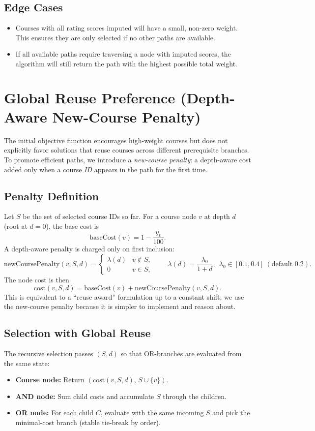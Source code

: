 \documentclass[11pt]{article}
\begin{document}
\subsection{Edge Cases}

\begin{itemize}
    \item Courses with all rating scores imputed will have a small, non-zero weight. This ensures they are only selected if no other paths are available.
    \item If all available paths require traversing a node with imputed scores, the algorithm will still return the path with the highest possible total weight.
\end{itemize}

\section{Global Reuse Preference (Depth-Aware New-Course Penalty)}
\label{sec:reuse-penalty}

The initial objective function encourages high-weight courses but does not explicitly favor solutions that reuse courses across different prerequisite branches. To promote efficient paths, we introduce a \emph{new-course penalty}: a depth-aware cost added only when a course \emph{ID} appears in the path for the first time.

\subsection{Penalty Definition}
Let $S$ be the set of selected course IDs so far. For a course node $v$ at depth $d$ (root at $d=0$), the base cost is
\[
  \text{baseCost}(v) = 1 - \frac{y_v}{100}.
\]
A depth-aware penalty is charged only on first inclusion:
\[
  \text{newCoursePenalty}(v, S, d) =
  \begin{cases}
    \lambda(d) & v \notin S,\\
    0 & v \in S,
  \end{cases}
\qquad \lambda(d) = \dfrac{\lambda_0}{1+d},\ \ \lambda_0\in[0.1,0.4] \ (\text{default }0.2).
\]
The node cost is then
\[
  \text{cost}(v, S, d) = \text{baseCost}(v) + \text{newCoursePenalty}(v, S, d).
\]
This is equivalent to a ``reuse award'' formulation up to a constant shift; we use the new-course penalty because it is simpler to implement and reason about.

\subsection{Selection with Global Reuse}
The recursive selection passes $(S,d)$ so that OR-branches are evaluated from the same state:
\begin{itemize}
  \item \textbf{Course node:} Return $(\text{cost}(v,S,d),\, S\cup\{v\})$.
  \item \textbf{AND node:} Sum child costs and accumulate $S$ through the children.
  \item \textbf{OR node:} For each child $C$, evaluate with the same incoming $S$ and pick the minimal-cost branch (stable tie-break by order).
\end{itemize}
\end{document}
